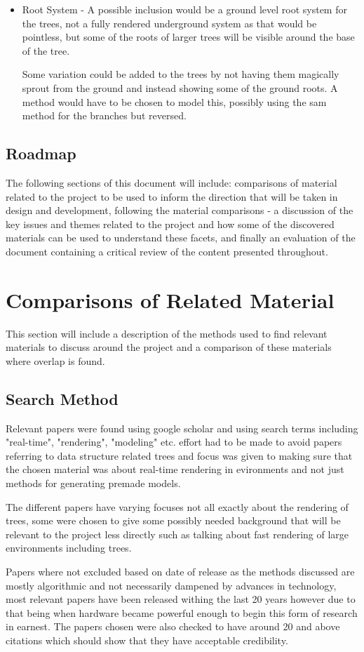 \documentclass[review]{cmpreport}
\begin{document}
\begin{itemize}
      \item Root System - A possible inclusion would be a ground level root 
            system for the trees, not a fully rendered underground system as 
            that would be pointless, but some of the roots of larger trees 
            will be visible around the base of the tree. \par 
            Some variation could be added to the trees by not having them 
            magically sprout from the ground and instead showing some of the 
            ground roots. A method would have to be chosen to model this, 
            possibly using the sam method for the branches but reversed.
\end{itemize}

\subsection{Roadmap}
The following sections of this document will include: comparisons of material 
related to the project to be used to inform the direction that will be taken in 
design and development, following the material comparisons - a discussion of 
the key issues and themes related to the project and how some of the discovered 
materials can be used to understand these facets, and finally an evaluation of 
the document containing a critical review of the content presented throughout.

\pagebreak
\section{Comparisons of Related Material}
This section will include a description of the methods used to find relevant 
materials to discuss around the project and a comparison of these materials 
where overlap is found.

\subsection{Search Method}
Relevant papers were found using google scholar and using search terms including 
"real-time", "rendering", "modeling" etc. effort had to be made to avoid papers 
referring to data structure related trees and focus was given to making sure that 
the chosen material was about real-time rendering in evironments and not just 
methods for generating premade models. \par
The different papers have varying focuses not all exactly about the rendering 
of trees, some were chosen to give some possibly needed background that will 
be relevant to the project less directly such as talking about fast rendering of 
large environments including trees. \par
Papers where not excluded based on date of release as the methods discussed are 
mostly algorithmic and not necessarily dampened by advances in technology, 
most relevant papers have been released withing the last 20 years however due 
to that being when hardware became powerful enough to begin this form of research 
in earnest. The papers chosen were also checked to have around 20 and above 
citations which should show that they have acceptable credibility.
\end{document}

